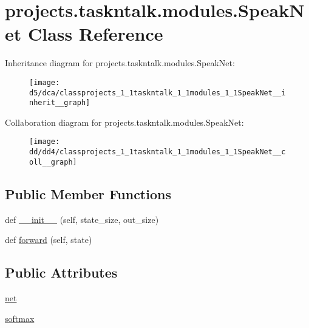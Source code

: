 \hypertarget{classprojects_1_1taskntalk_1_1modules_1_1SpeakNet}{}\section{projects.\+taskntalk.\+modules.\+Speak\+Net Class Reference}
\label{classprojects_1_1taskntalk_1_1modules_1_1SpeakNet}


Inheritance diagram for projects.\+taskntalk.\+modules.\+Speak\+Net\+:\nopagebreak
\begin{figure}[H]
\begin{center}
\leavevmode
\texttt{[image: d5/dca/classprojects\_1\_1taskntalk\_1\_1modules\_1\_1SpeakNet\_\_inherit\_\_graph]}
\end{center}
\end{figure}


Collaboration diagram for projects.\+taskntalk.\+modules.\+Speak\+Net\+:\nopagebreak
\begin{figure}[H]
\begin{center}
\leavevmode
\texttt{[image: dd/dd4/classprojects\_1\_1taskntalk\_1\_1modules\_1\_1SpeakNet\_\_coll\_\_graph]}
\end{center}
\end{figure}
\subsection*{Public Member Functions}
\begin{DoxyCompactItemize}
\item 
def \hyperlink{classprojects_1_1taskntalk_1_1modules_1_1SpeakNet_a2ecf76584e43c792e8480146b99dc746}{\+\_\+\+\_\+init\+\_\+\+\_\+} (self, state\+\_\+size, out\+\_\+size)
\item 
def \hyperlink{classprojects_1_1taskntalk_1_1modules_1_1SpeakNet_a021aca62f72ae7f3fd7787c76883866e}{forward} (self, state)
\end{DoxyCompactItemize}
\subsection*{Public Attributes}
\begin{DoxyCompactItemize}
\item 
\hyperlink{classprojects_1_1taskntalk_1_1modules_1_1SpeakNet_ad9777e1aceeb36bedb44e5bcbf9cf7c3}{net}
\item 
\hyperlink{classprojects_1_1taskntalk_1_1modules_1_1SpeakNet_aa6d9a715cdd73868cd0d57f4e5e240e0}{softmax}
\end{DoxyCompactItemize}


